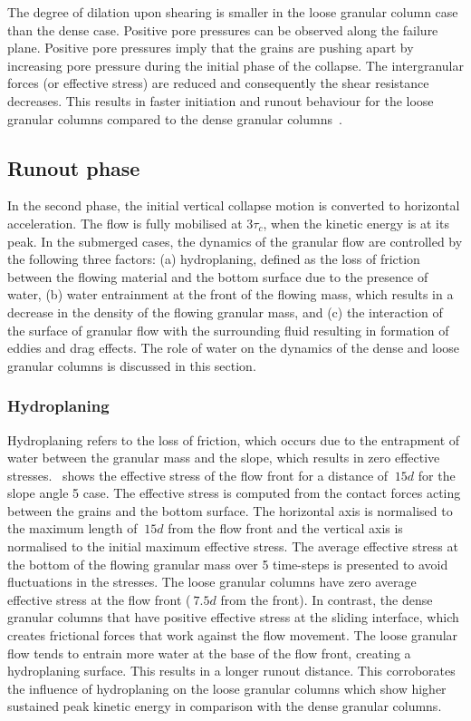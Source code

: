 \documentclass[12pt,twoside]{tuhhproc-en}
\begin{document}
The degree of dilation upon shearing is smaller in the loose granular column case than the dense case. Positive pore pressures can be observed along the failure plane. Positive pore pressures imply that the grains are pushing apart by increasing pore pressure during the initial phase of the collapse. The intergranular forces (or effective stress) are reduced and consequently the shear resistance decreases. This results in faster initiation and runout behaviour for the loose granular columns compared to the dense granular columns~\citep{Kumar2017}.


\subsection{Runout phase}
In the second phase, the initial vertical collapse motion is converted to horizontal acceleration. The flow is fully mobilised at $3\tau_c$, when the kinetic energy is at its peak. In the submerged cases, the dynamics of the granular flow are controlled by the following three factors: (a) hydroplaning, defined as the loss of friction between the flowing material and the bottom surface due to the presence of water, (b) water entrainment at the front of the flowing mass, which results in a decrease in the density of the flowing granular mass, and (c) the interaction of the surface of granular flow with the surrounding fluid resulting in formation of eddies and drag effects. The role of water on the dynamics of the dense and loose granular columns is discussed in this section.

\subsubsection{Hydroplaning}
Hydroplaning refers to the loss of friction, which occurs due to the entrapment of water between the granular mass and the slope, which results in zero effective stresses.~ shows the effective stress of the flow front for a distance of $~15d$ for the slope angle \si{5}{\degree} case. The effective stress is computed from the contact forces acting between the grains and the bottom surface. The horizontal axis is normalised to the maximum length of $~15d$ from the flow front and the vertical axis is normalised to the initial maximum effective stress. The average effective stress at the bottom of the flowing granular mass over 5 time-steps is presented to avoid fluctuations in the stresses. The loose granular columns have zero average effective stress at the flow front ($~7.5d$ from the front). In contrast, the dense granular columns that have positive effective stress at the sliding interface, which creates frictional forces that work against the flow movement. The loose granular flow tends to entrain more water at the base of the flow front, creating a hydroplaning surface. This results in a longer runout distance. This corroborates the influence of hydroplaning on the loose granular columns which show higher sustained peak kinetic energy in comparison with the dense granular columns.
\end{document}
